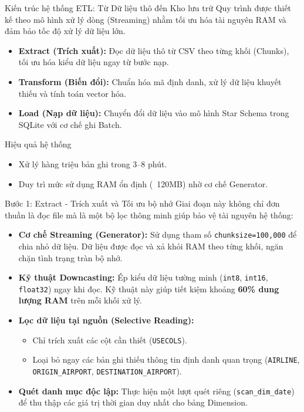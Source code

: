 \begin{frame}{Kiến trúc hệ thống ETL: Từ Dữ liệu thô đến Kho lưu trữ}
  Quy trình được thiết kế theo mô hình xử lý dòng (Streaming) nhằm tối ưu hóa tài nguyên RAM và đảm bảo tốc độ xử lý dữ liệu lớn.
  
  \begin{itemize}
      \item \textbf{Extract (Trích xuất):} Đọc dữ liệu thô từ CSV theo từng khối (Chunks), tối ưu hóa kiểu dữ liệu ngay từ bước nạp.
      \item \textbf{Transform (Biến đổi):} Chuẩn hóa mã định danh, xử lý dữ liệu khuyết thiếu và tính toán vector hóa.
      \item \textbf{Load (Nạp dữ liệu):} Chuyển đổi dữ liệu vào mô hình Star Schema trong SQLite với cơ chế ghi Batch.
  \end{itemize}
  
  \begin{block}{Hiệu quả hệ thống}
      \begin{itemize}
          \item Xử lý hàng triệu bản ghi trong 3--8 phút.
          \item Duy trì mức sử dụng RAM ổn định (~120MB) nhờ cơ chế Generator.
      \end{itemize}
  \end{block}
  \end{frame}

\begin{frame}{Bước 1: Extract - Trích xuất và Tối ưu bộ nhớ}
  Giai đoạn này không chỉ đơn thuần là đọc file mà là một bộ lọc thông minh giúp bảo vệ tài nguyên hệ thống:
  
  \begin{itemize}
      \item \textbf{Cơ chế Streaming (Generator):} Sử dụng tham số \texttt{chunksize=100,000} để chia nhỏ dữ liệu. Dữ liệu được đọc và xả khỏi RAM theo từng khối, ngăn chặn tình trạng tràn bộ nhớ.
      \item \textbf{Kỹ thuật Downcasting:} Ép kiểu dữ liệu tường minh (\texttt{int8}, \texttt{int16}, \texttt{float32}) ngay khi đọc. Kỹ thuật này giúp tiết kiệm khoảng \textbf{60\% dung lượng RAM} trên mỗi khối xử lý.
      \item \textbf{Lọc dữ liệu tại nguồn (Selective Reading):}
          \begin{itemize}
              \item Chỉ trích xuất các cột cần thiết (\texttt{USECOLS}).
              \item Loại bỏ ngay các bản ghi thiếu thông tin định danh quan trọng (\texttt{AIRLINE}, \texttt{ORIGIN\_AIRPORT}, \texttt{DESTINATION\_AIRPORT}).
          \end{itemize}
      \item \textbf{Quét danh mục độc lập:} Thực hiện một lượt quét riêng (\texttt{scan\_dim\_date}) để thu thập các giá trị thời gian duy nhất cho bảng Dimension.
  \end{itemize}
  \end{frame}

